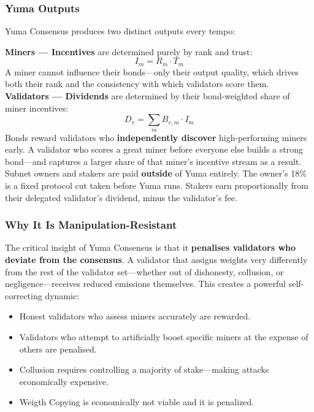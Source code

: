\documentclass[12pt, a4paper, oneside]{report}
\theoremstyle{definition}
\begin{document}
\subsubsection*{Yuma Outputs}

Yuma Consensus produces two distinct outputs every tempo:

\textbf{Miners — Incentives} are determined purely by rank and trust:
\[
  I_m = R_m \cdot T_m
\]
A miner cannot influence their bonds—only their output quality, which drives 
both their rank and the consistency with which validators score them.\\[0.4cm]

\textbf{Validators — Dividends} are determined by their bond-weighted share 
of miner incentives:
\[
  D_v = \sum_{m} B_{v,m} \cdot I_m
\]
Bonds reward validators who \textbf{independently discover} high-performing 
miners early. A validator who scores a great miner before everyone else builds 
a strong bond—and captures a larger share of that miner's incentive stream 
as a result.\\[0.4cm]

\noindent Subnet owners and stakers are paid \textbf{outside} of Yuma entirely. 
The owner's 18\% is a fixed protocol cut taken before Yuma runs. Stakers earn 
proportionally from their delegated validator's dividend, minus the validator's fee.


\subsubsection*{Why It Is Manipulation-Resistant}

The critical insight of Yuma Consensus is that it \textbf{penalises validators 
who deviate from the consensus}. A validator that assigns weights very differently 
from the rest of the validator set—whether out of dishonesty, collusion, or 
negligence—receives reduced emissions themselves. This creates a powerful 
self-correcting dynamic:

\begin{itemize}
  \item Honest validators who assess miners accurately are rewarded.
  \item Validators who attempt to artificially boost specific miners at the 
        expense of others are penalised.
  \item Collusion requires controlling a majority of stake—making attacks 
        economically expensive.
  \item Weigth Copying is economically not viable and it is penalized.
\end{itemize}\\
\end{document}
